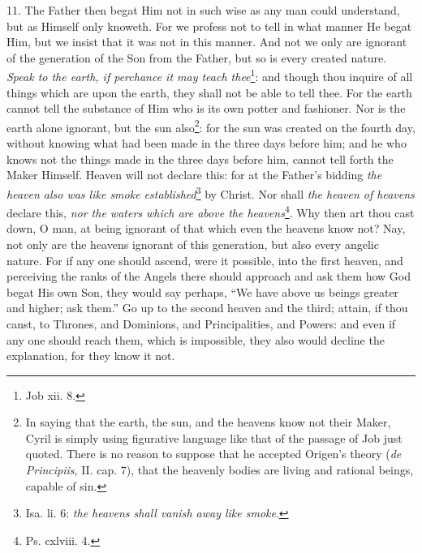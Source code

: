 11. The Father then begat Him not in such wise as any man could understand, but as Himself only knoweth. For we profess not to tell in what manner He begat Him, but we insist that it was not in this manner. And not we only are ignorant of the generation of the Son from the Father, but so is every created nature. \emph{Speak to the earth, if perchance it may teach thee}\footnote{Job xii. 8.}: and though thou inquire of all things which are upon the earth, they shall not be able to tell thee. For the earth cannot tell the substance of Him who is its own potter and fashioner. Nor is the earth alone ignorant, but the sun also\footnote{In saying that the earth, the sun, and the heavens know not their Maker, Cyril is simply using figurative language like that of the passage of Job just quoted. There is no reason to suppose that he accepted Origen’s theory (\emph{de Principiis}, II. cap. 7), that the heavenly bodies are living and rational beings, capable of sin.}: for the sun was created on the fourth day, without knowing what had been made in the three days before him; and he who knows not the things made in the three days before him, cannot tell forth the Maker Himself. Heaven will not declare this: for at the Father’s bidding \emph{the heaven also was like smoke established}\footnote{Isa. li. 6: \emph{the heavens shall vanish away like smoke}.} by Christ. Nor shall \emph{the heaven of heavens} declare this, \emph{nor the waters which are above the heavens}\footnote{Ps. cxlviii. 4.}. Why then art thou cast down, O man, at being ignorant of that which even the heavens know not? Nay, not only are the heavens ignorant of this generation, but also every angelic nature. For if any one should ascend, were it possible, into the first heaven, and perceiving the ranks of the Angels there should approach and ask them how God begat His own Son, they would say perhaps, “We have above us beings greater and higher; ask them.” Go up to the second heaven and the third; attain, if thou canst, to Thrones, and Dominions, and Principalities, and Powers: and even if any one should reach them, which is impossible, they also would decline the explanation, for they know it not.

